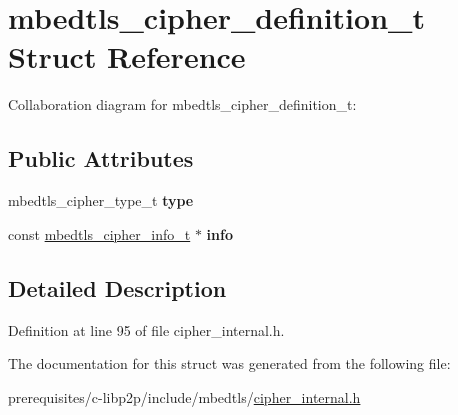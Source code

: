 \hypertarget{structmbedtls__cipher__definition__t}{}\section{mbedtls\+\_\+cipher\+\_\+definition\+\_\+t Struct Reference}
\label{structmbedtls__cipher__definition__t}


Collaboration diagram for mbedtls\+\_\+cipher\+\_\+definition\+\_\+t\+:
\subsection*{Public Attributes}
\begin{DoxyCompactItemize}
\item 
\mbox{\label{structmbedtls__cipher__definition__t_a243ed1741dacc6a6b9281737022d43ff}} 
mbedtls\+\_\+cipher\+\_\+type\+\_\+t {\bfseries type}
\item 
\mbox{\label{structmbedtls__cipher__definition__t_ad3fb3d04325ef02d9f04db18f87d544c}} 
const \mbox{\hyperlink{structmbedtls__cipher__info__t}{mbedtls\+\_\+cipher\+\_\+info\+\_\+t}} $\ast$ {\bfseries info}
\end{DoxyCompactItemize}


\subsection{Detailed Description}


Definition at line 95 of file cipher\+\_\+internal.\+h.



The documentation for this struct was generated from the following file\+:\begin{DoxyCompactItemize}
\item 
prerequisites/c-\/libp2p/include/mbedtls/\mbox{\hyperlink{cipher__internal_8h}{cipher\+\_\+internal.\+h}}\end{DoxyCompactItemize}
